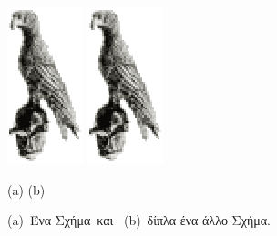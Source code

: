 \begin{figure}[t]
 \centerline{ {\includegraphics[scale=0.9]{bird.eps}}
              \hskip 2.3in
              {\includegraphics[scale=0.9]{bird.eps}}}
 \centerline{(a) \hskip 2.5in (b) \hskip 0.1in}
 \centering
 \vspace{0.0cm}
 \caption{(a)~Ένα Σχήμα\  και \  (b)~δίπλα ένα άλλο Σχήμα.}\label{fig1}
\end{figure}
